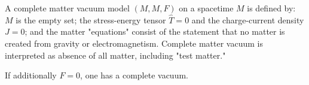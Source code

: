 A complete matter vacuum model $(M, M, F)$ on a spacetime $M$ is defined by: $M$ is the empty set; the stress-energy tensor $\hat{T} = 0$ and the charge-current density $J = 0$; and the matter "equations" consist of the statement that no matter is created from gravity or electromagnetism. Complete matter vacuum is interpreted as absence of all matter, including "test matter."

If additionally $F = 0$, one has a complete vacuum.
